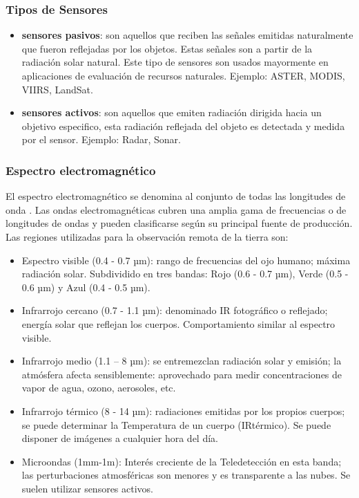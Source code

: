 \subsubsection{Tipos de Sensores}
\begin{itemize}
\item \textbf{sensores pasivos}: son aquellos que reciben las señales emitidas naturalmente que fueron reflejadas por los objetos. Estas señales son a partir de la radiación solar natural. Este tipo de sensores son  usados mayormente en aplicaciones de evaluación de recursos naturales. Ejemplo: ASTER, MODIS, VIIRS, LandSat.

\item \textbf{sensores activos}: son aquellos que emiten radiación dirigida hacia un objetivo especifico, esta radiación reflejada del objeto es detectada y medida por el sensor. Ejemplo: Radar, Sonar.
\end{itemize}

\subsubsection{Espectro electromagnético}

El espectro electromagnético se denomina al conjunto de todas las longitudes de onda \citep{chuvieco}. Las ondas electromagnéticas cubren una amplia gama de frecuencias o de longitudes de ondas y pueden clasificarse según su principal fuente de producción. 
Las regiones utilizadas para la observación remota de la tierra son:
\begin{itemize}
\item Espectro visible (0.4 - 0.7 µm): rango de frecuencias del ojo humano; máxima radiación solar. Subdividido en tres bandas: Rojo (0.6 - 0.7 µm), Verde (0.5 - 0.6 µm) y Azul (0.4 - 0.5 µm).

\item Infrarrojo cercano (0.7 - 1.1 µm): denominado IR fotográfico o reflejado; energía solar que reflejan los cuerpos. Comportamiento similar al espectro visible.

\item Infrarrojo medio (1.1 – 8 µm): se entremezclan radiación solar y emisión; la atmósfera afecta sensiblemente: aprovechado para medir concentraciones de vapor de agua, ozono, aerosoles, etc.

\item Infrarrojo térmico (8 - 14 µm): radiaciones emitidas por los propios cuerpos; se puede determinar la Temperatura de un cuerpo (IRtérmico). Se puede disponer de imágenes a cualquier hora del día.

\item Microondas (1mm-1m): Interés creciente de la Teledetección en esta banda; las perturbaciones atmosféricas son menores y es transparente a las nubes. Se suelen utilizar sensores activos. 

\end{itemize}

